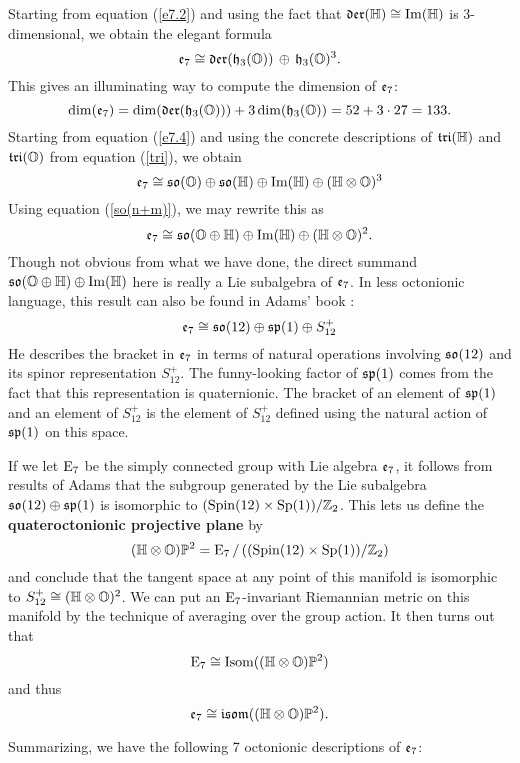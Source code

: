 Starting from equation (\ref{e7.2}) and using the fact that
${\mathfrak {der}}({\mathbb H}) \cong {\rm Im}({\mathbb H})$ is 3-dimensional, we obtain the elegant
formula
\[ 
{\mathfrak {e}}_7 \cong {\mathfrak {der}}({\mathfrak {h}}_3({\mathbb O})) \, \oplus \, {\mathfrak {h}}_3({\mathbb O})^3  .
\label{e7.5}
\]
This gives an illuminating way to compute the dimension of ${\mathfrak {e}}_7$:
\[ \dim({\mathfrak {e}}_7) = \dim({\mathfrak {der}}({\mathfrak {h}}_3({\mathbb O}))) + 3 \dim({\mathfrak {h}}_3({\mathbb O})) = 52 + 3 \cdot 27 = 
133 .\]
Starting from equation (\ref{e7.4}) and using the concrete 
descriptions of ${\mathfrak {tri}}({\mathbb H})$ and ${\mathfrak {tri}}({\mathbb O})$ from equation
(\ref{tri}), we obtain
\[
{\mathfrak {e}}_7 \cong {\mathfrak {so}}({\mathbb O}) \oplus {\mathfrak {so}}({\mathbb H}) \oplus {\rm Im}({\mathbb H}) \oplus ({\mathbb H} \otimes {\mathbb O})^3 
\label{e7.6}
\]
Using equation (\ref{so(n+m)}), we may rewrite this as
\[
{\mathfrak {e}}_7 \cong {\mathfrak {so}}({\mathbb O} \oplus {\mathbb H}) \oplus {\rm Im}({\mathbb H}) \oplus ({\mathbb H} \otimes {\mathbb O})^2.
\label{e7.7}
\]
Though not obvious from what we have done, the direct summand ${\mathfrak {so}}({\mathbb O}
\oplus {\mathbb H}) \oplus {\rm Im}({\mathbb H})$ here is really a Lie subalgebra of ${\mathfrak {e}}_7$. In
less octonionic language, this result can also be found in Adams' book
\cite{Adams}:
\[
{\mathfrak {e}}_7 \cong {\mathfrak {so}}(12) \oplus {\mathfrak {sp}}(1) \oplus S_{12}^+ 
\label{e7.8}
\]
He describes the bracket in ${\mathfrak {e}}_7$ in terms of natural operations
involving ${\mathfrak {so}}(12)$ and its spinor representation $S_{12}^+$.   The
funny-looking factor of ${\mathfrak {sp}}(1)$ comes from the fact that this
representation is quaternionic.  The bracket of an element of ${\mathfrak {sp}}(1)$ and
an element of $S_{12}^+$ is the element of $S_{12}^+$ defined using
the natural action of ${\mathfrak {sp}}(1)$ on this space.

If we let ${\rm E}_7$ be the simply connected group with Lie 
algebra ${\mathfrak {e}}_7$, it follows from results of Adams \cite{Adams} that the
subgroup generated by the Lie subalgebra ${\mathfrak {so}}(12) \oplus {\mathfrak {sp}}(1)$ is
isomorphic to $({\rm Spin}(12) \times {\rm Sp}(1))/{\mathbb Z}_2$.  
This lets us define the {\bf quateroctonionic projective plane} by
\[    ({\mathbb H} \otimes {\mathbb O}){\mathbb P}^2 = {\rm E}_7\, / \,(({\rm Spin}(12) \times {\rm Sp}(1))/{\mathbb Z}_2) \]
and conclude that the tangent space at any point of this manifold is
isomorphic to $S_{12}^+ \cong ({\mathbb H} \otimes {\mathbb O})^2$.   We can put 
an ${\rm E}_7$-invariant Riemannian metric on this manifold by the technique
of averaging over the group action.  It then turns out \cite{Besse} that
\[        {\rm E}_7 \cong {\rm Isom}(({\mathbb H} \otimes {\mathbb O}){\mathbb P}^2)
\]
and thus
\[
{\mathfrak {e}}_7 \cong {\mathfrak {isom}}(({\mathbb H} \otimes {\mathbb O}){\mathbb P}^2)  .
\label{e7.9}
\]

Summarizing, we have the following 7 octonionic descriptions of ${\mathfrak {e}}_7$:   
   
